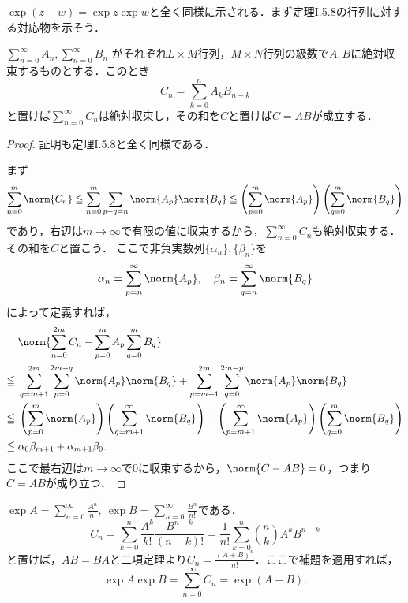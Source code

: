 $\exp(z + w) = \exp z \exp w$と全く同様に示される．まず定理I.5.8の行列に対する対応物を示そう．

\begin{lemma}{}{}
    $\sum_{n=0}^\infty A_n, \sum_{n=0}^\infty B_n$ がそれぞれ$L \times M$行列，$M \times N$行列の級数で$A, B$に絶対収束するものとする．このとき
    \[
        C_n = \sum_{k=0}^n A_kB_{n-k}
    \]
    と置けば$\sum_{n=0}^\infty C_n$は絶対収束し，その和を$C$と置けば$C = AB$が成立する．
\end{lemma}

\begin{proof}
    証明も定理I.5.8と全く同様である．

    まず
    \[
        \sum_{n = 0}^m\norm{C_n} \leq \sum_{n = 0}^m\sum_{p + q = n}\norm{A_p}\norm{B_q} \leq \left(\sum_{p=0}^m \norm{A_p}\right) \left(\sum_{q=0}^m \norm{B_q}\right)
    \]
    であり，右辺は$m \to \infty$で有限の値に収束するから，$\sum_{n=0}^\infty C_n$も絶対収束する．その和を$C$と置こう．
    ここで非負実数列$\{\alpha_n\}, \{\beta_n\}$を
    \[
        \alpha_n = \sum_{p = n}^\infty \norm{A_p},\quad \beta_n = \sum_{q = n}^\infty \norm{B_q}
    \]
    によって定義すれば，
    \begin{align*}
               & \norm{\sum_{n=0}^{2m} C_n - \sum_{p = 0}^m A_p \sum_{q = 0}^m B_q}                                                                                                  \\
        \leq{} & \sum_{q = m + 1}^{2m} \sum_{p = 0}^{2m - q} \norm{A_p}\norm{B_q} + \sum_{p = m+1}^{2m}\sum_{q = 0}^{2m - p} \norm{A_p}\norm{B_q}                                    \\
        \leq{} & \left(\sum_{p=0}^m \norm{A_p}\right) \left(\sum_{q=m+1}^\infty \norm{B_q}\right) + \left(\sum_{p=m+1}^\infty \norm{A_p}\right) \left(\sum_{q=0}^m \norm{B_q}\right) \\
        \leq{} & \alpha_0\beta_{m+1} + \alpha_{m+1}\beta_0.
    \end{align*}
    ここで最右辺は$m \to \infty$で$0$に収束するから，$\norm{C - AB} = 0$，つまり$C = AB$が成り立つ．
\end{proof}

\begin{tproof}
    $\exp A = \sum_{n=0}^\infty \frac{A^n}{n!},\ \exp B = \sum_{n=0}^\infty \frac{B^n}{n!}$である．
    \[
        C_n = \sum_{k = 0}^n \frac{A^k}{k!} \frac{B^{n-k}}{(n-k)!}
        = \frac{1}{n!} \sum_{k=0}^n \binom{n}{k} A^k B^{n-k}
    \]
    と置けば，$AB = BA$と二項定理より$C_n = \frac{(A + B)^n}{n!}$．ここで補題を適用すれば，
    \[
        \exp A \exp B = \sum_{n=0}^\infty C_n = \exp(A + B).
    \]
\end{tproof}


